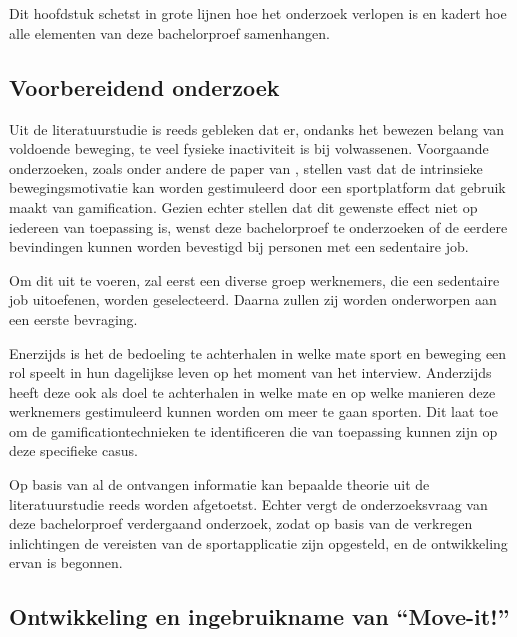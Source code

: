 
\chapter{}%
\label{ch:methodologie}

Dit hoofdstuk schetst in grote lijnen hoe het onderzoek verlopen is en kadert hoe alle elementen van deze bachelorproef samenhangen.

\section{Voorbereidend onderzoek}
Uit de literatuurstudie is reeds gebleken dat er, ondanks het bewezen belang van voldoende beweging, te veel fysieke inactiviteit is bij volwassenen. Voorgaande onderzoeken, zoals onder andere de paper van \textcite{Kari2016}, stellen vast dat de intrinsieke bewegingsmotivatie kan worden gestimuleerd door een sportplatform dat gebruik maakt van gamification. Gezien \textcite{Hamari2013} echter stellen dat dit gewenste effect niet op iedereen van toepassing is, wenst deze bachelorproef te onderzoeken of de eerdere bevindingen kunnen worden bevestigd bij personen met een sedentaire job.

Om dit uit te voeren, zal eerst een diverse groep werknemers, die een sedentaire job uitoefenen, worden geselecteerd. Daarna zullen zij worden onderworpen aan een eerste bevraging.

Enerzijds is het de bedoeling te achterhalen in welke mate sport en beweging een rol speelt in hun dagelijkse leven op het moment van het interview. Anderzijds heeft deze ook als doel te achterhalen in welke mate en op welke manieren deze werknemers gestimuleerd kunnen worden om meer te gaan sporten. Dit laat toe om de gamificationtechnieken te identificeren die van toepassing kunnen zijn op deze specifieke casus.

Op basis van al de ontvangen informatie kan bepaalde theorie uit de literatuurstudie reeds worden afgetoetst. Echter vergt de onderzoeksvraag van deze bachelorproef verdergaand onderzoek, zodat op basis van de verkregen inlichtingen de vereisten van de sportapplicatie zijn opgesteld, en de ontwikkeling ervan is begonnen.

\section{Ontwikkeling en ingebruikname van ``Move-it!''}

